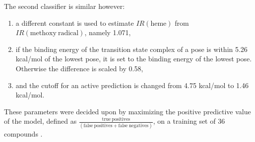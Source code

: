 The second classifier is similar however:
\begin{enumerate}
\item a different constant is used to estimate $IR(\mathrm{heme})$ from $IR(\mathrm{methoxy\ radical})$, namely 1.071,
\item if the binding energy of the transition state complex of a pose is within 5.26 kcal/mol of the lowest pose, it is set to the binding energy of the lowest pose.
Otherwise the difference is scaled by 0.58,
\item and the cutoff for an active prediction is changed from 4.75 kcal/mol to 1.46 kcal/mol.
\end{enumerate}
These parameters were decided upon by maximizing the positive predictive value of the model, defined as $\frac{\mathrm{true\ positives}}{(\mathrm{false\ positives + false\ negatives})}$, on a training set of 36 compounds \cite{altman1994statistics}.
